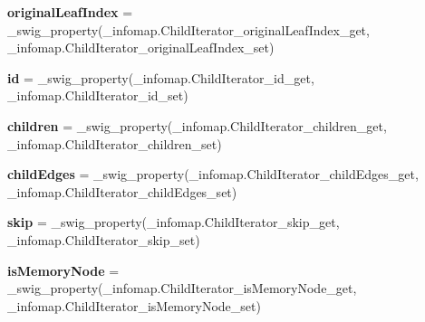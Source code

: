\begin{DoxyCompactItemize}
\item 
\mbox{\label{classdsmacc_1_1graph_1_1infomap_1_1ChildIterator_a5a6aef819f4466246cec70017c2e054d}} 
{\bfseries original\+Leaf\+Index} = \+\_\+swig\+\_\+property(\+\_\+infomap.\+Child\+Iterator\+\_\+original\+Leaf\+Index\+\_\+get, \+\_\+infomap.\+Child\+Iterator\+\_\+original\+Leaf\+Index\+\_\+set)
\item 
\mbox{\label{classdsmacc_1_1graph_1_1infomap_1_1ChildIterator_af02c4baa72a4ba687f07a443a6a27217}} 
{\bfseries id} = \+\_\+swig\+\_\+property(\+\_\+infomap.\+Child\+Iterator\+\_\+id\+\_\+get, \+\_\+infomap.\+Child\+Iterator\+\_\+id\+\_\+set)
\item 
\mbox{\label{classdsmacc_1_1graph_1_1infomap_1_1ChildIterator_a7b2b8ffdea408131dd595e0fa5cc2993}} 
{\bfseries children} = \+\_\+swig\+\_\+property(\+\_\+infomap.\+Child\+Iterator\+\_\+children\+\_\+get, \+\_\+infomap.\+Child\+Iterator\+\_\+children\+\_\+set)
\item 
\mbox{\label{classdsmacc_1_1graph_1_1infomap_1_1ChildIterator_a80f7752aa65f6bc5ae5ef759fc6b85cc}} 
{\bfseries child\+Edges} = \+\_\+swig\+\_\+property(\+\_\+infomap.\+Child\+Iterator\+\_\+child\+Edges\+\_\+get, \+\_\+infomap.\+Child\+Iterator\+\_\+child\+Edges\+\_\+set)
\item 
\mbox{\label{classdsmacc_1_1graph_1_1infomap_1_1ChildIterator_ae42103df6a5accc88ac2cb8c3cc6bb1b}} 
{\bfseries skip} = \+\_\+swig\+\_\+property(\+\_\+infomap.\+Child\+Iterator\+\_\+skip\+\_\+get, \+\_\+infomap.\+Child\+Iterator\+\_\+skip\+\_\+set)
\item 
\mbox{\label{classdsmacc_1_1graph_1_1infomap_1_1ChildIterator_a831e5b4ddb89dbb6bc43c5a60602bc74}} 
{\bfseries is\+Memory\+Node} = \+\_\+swig\+\_\+property(\+\_\+infomap.\+Child\+Iterator\+\_\+is\+Memory\+Node\+\_\+get, \+\_\+infomap.\+Child\+Iterator\+\_\+is\+Memory\+Node\+\_\+set)
\item 
\mbox{\label{classdsmacc_1_1graph_1_1infomap_1_1ChildIterator_afbe3b9844fc10bb7a186d65bccb7aa69}} 

\end{DoxyCompactItemize}
